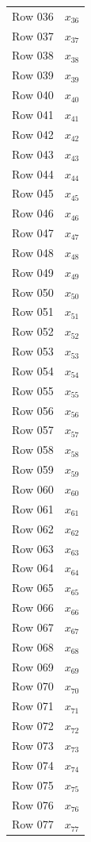 \documentclass{article}
\begin{document}
\begin{longtable}{lr}
Row 036 & $x_{36}$ \\
Row 037 & $x_{37}$ \\
Row 038 & $x_{38}$ \\
Row 039 & $x_{39}$ \\
Row 040 & $x_{40}$ \\
Row 041 & $x_{41}$ \\
Row 042 & $x_{42}$ \\
Row 043 & $x_{43}$ \\
Row 044 & $x_{44}$ \\
Row 045 & $x_{45}$ \\
Row 046 & $x_{46}$ \\
Row 047 & $x_{47}$ \\
Row 048 & $x_{48}$ \\
Row 049 & $x_{49}$ \\
Row 050 & $x_{50}$ \\
Row 051 & $x_{51}$ \\
Row 052 & $x_{52}$ \\
Row 053 & $x_{53}$ \\
Row 054 & $x_{54}$ \\
Row 055 & $x_{55}$ \\
Row 056 & $x_{56}$ \\
Row 057 & $x_{57}$ \\
Row 058 & $x_{58}$ \\
Row 059 & $x_{59}$ \\
Row 060 & $x_{60}$ \\
Row 061 & $x_{61}$ \\
Row 062 & $x_{62}$ \\
Row 063 & $x_{63}$ \\
Row 064 & $x_{64}$ \\
Row 065 & $x_{65}$ \\
Row 066 & $x_{66}$ \\
Row 067 & $x_{67}$ \\
Row 068 & $x_{68}$ \\
Row 069 & $x_{69}$ \\
Row 070 & $x_{70}$ \\
Row 071 & $x_{71}$ \\
Row 072 & $x_{72}$ \\
Row 073 & $x_{73}$ \\
Row 074 & $x_{74}$ \\
Row 075 & $x_{75}$ \\
Row 076 & $x_{76}$ \\
Row 077 & $x_{77}$ \\

\end{longtable}
\end{document}
